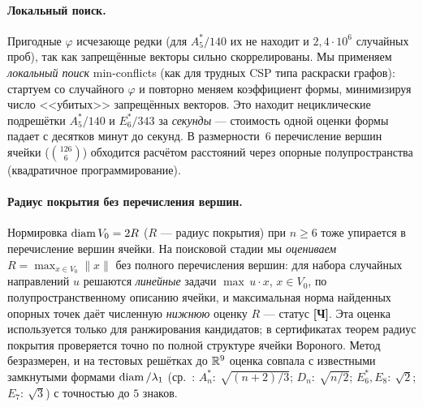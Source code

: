 \paragraph{Локальный поиск.} Пригодные $\varphi$ исчезающе редки (для $A_5^*/140$ их
не находит и $2{,}4\cdot10^6$ случайных проб), так как запрещённые векторы сильно
скоррелированы. Мы применяем \emph{локальный поиск} min-conflicts (как для
трудных CSP типа раскраски графов): стартуем со случайного $\varphi$ и повторно
меняем коэффициент формы, минимизируя число <<убитых>> запрещённых векторов. Это
находит нециклические подрешётки $A_5^*/140$ и $E_6^*/343$ за \emph{секунды} ---
стоимость одной оценки формы падает с десятков минут до секунд. В размерности~6
перечисление вершин ячейки ($\binom{126}{6}$) обходится расчётом расстояний
через опорные полупространства (квадратичное программирование).

\paragraph{Радиус покрытия без перечисления вершин.} Нормировка $\operatorname{diam} V_0=2R$
($R$ --- радиус покрытия) при $n\ge6$ тоже упирается в перечисление вершин
ячейки. На поисковой стадии мы \emph{оцениваем} $R=\max_{x\in V_0}\|x\|$ без
полного перечисления вершин: для набора случайных направлений $u$ решаются
\emph{линейные} задачи $\max\,u\!\cdot\!x$, $x\in V_0$, по
полупространственному описанию ячейки, и максимальная норма найденных опорных
точек даёт численную \emph{нижнюю} оценку $R$ --- статус \textbf{[Ч]}. Эта
оценка используется только для ранжирования кандидатов; в сертификатах теорем
радиус покрытия проверяется точно по полной структуре ячейки Вороного. Метод
безразмерен, и на тестовых решётках до $\mathbb{R}^9$ оценка совпала с известными
замкнутыми формами $\operatorname{diam}/\lambda_1$
(ср.~\cite{ConwaySloane,SchurmannVallentin}: $A_n^*{:}\ \sqrt{(n{+}2)/3}$;
$D_n{:}\ \sqrt{n/2}$; $E_6^*,E_8{:}\ \sqrt2$; $E_7{:}\ \sqrt3$) с точностью до
$5$ знаков.

